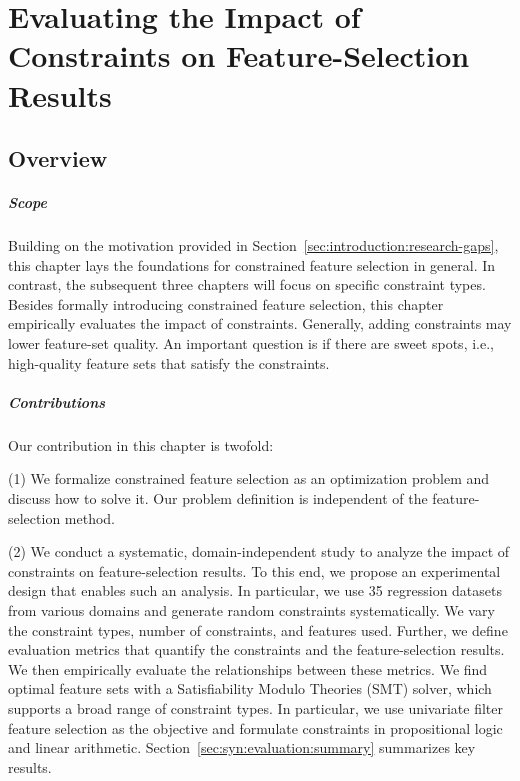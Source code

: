 \chapter{Evaluating the Impact of Constraints on Feature-Selection Results}
\label{sec:syn}

\section{Overview}
\label{sec:syn:overview}

\paragraph{Scope}

Building on the motivation provided in Section~\ref{sec:introduction:research-gaps}, this chapter lays the foundations for constrained feature selection in general.
In contrast, the subsequent three chapters will focus on specific constraint types.
Besides formally introducing constrained feature selection, this chapter empirically evaluates the impact of constraints.
Generally, adding constraints may lower feature-set quality.
An important question is if there are sweet spots, i.e., high-quality feature sets that satisfy the constraints.

\paragraph{Contributions}

Our contribution in this chapter is twofold:

(1) We formalize constrained feature selection as an optimization problem and discuss how to solve it.
Our problem definition is independent of the feature-selection method.

(2) We conduct a systematic, domain-independent study to analyze the impact of constraints on feature-selection results.
To this end, we propose an experimental design that enables such an analysis.
In particular, we use 35 regression datasets from various domains and generate random constraints systematically.
We vary the constraint types, number of constraints, and features used.
Further, we define evaluation metrics that quantify the constraints and the feature-selection results.
We then empirically evaluate the relationships between these metrics.
We find optimal feature sets with a Satisfiability Modulo Theories (SMT) solver, which supports a broad range of constraint types.
In particular, we use univariate filter feature selection as the objective and formulate constraints in propositional logic and linear arithmetic.
Section~\ref{sec:syn:evaluation:summary} summarizes key results.

